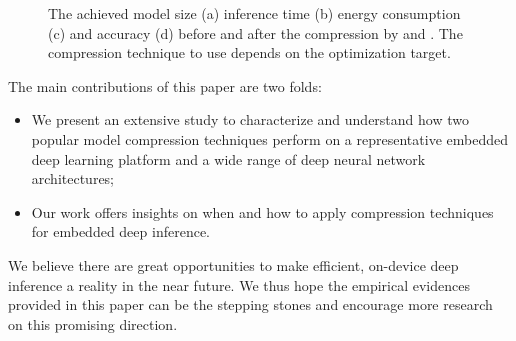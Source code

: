 \begin{figure}[!t]
\centering
{}
\hfill
{}
\hfill
{}
\hfill
{}
\hfill
\caption{The achieved model size (a) inference time (b) energy consumption (c) and accuracy (d) before and after the compression by \quantization and \pruning.
The compression technique to use depends on the optimization target.}
\vspace{-4mm}
\label{fig:motivation}
\end{figure}


The main contributions of this paper are two folds:

\begin{itemize}
\item We present an extensive study to characterize and understand how two popular model compression techniques perform on a
    representative embedded deep learning platform and a wide range of deep neural network architectures;
\item Our work offers insights on when and how to apply compression techniques for embedded deep inference.
\end{itemize}

We believe there are great opportunities to make efficient, on-device deep inference a reality in the near future. We thus hope the
empirical evidences provided in this paper can be the stepping stones and encourage more research on this promising direction.
